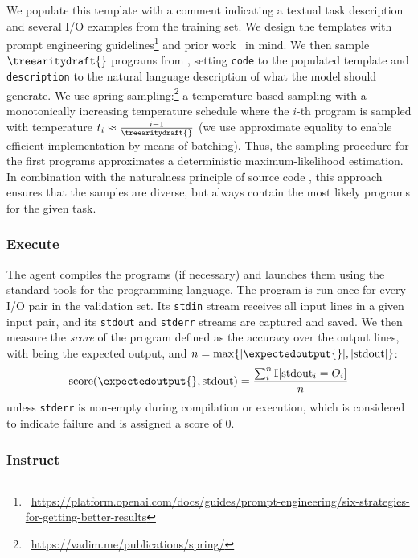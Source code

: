 We populate this template with a comment indicating a textual task description and several I/O examples from the training set.
We design the templates with prompt engineering guidelines\footnote{~\url{https://platform.openai.com/docs/guides/prompt-engineering/six-strategies-for-getting-better-results}} and prior work~\cite{debruin2021:autoencoders} in mind.
We then sample $\treearitydraft{}$ programs from \synthmodelnoargs{}, setting \texttt{code} to the populated template and \texttt{description} to the natural language description of what the model should generate.
We use spring sampling:\footnote{~\url{https://vadim.me/publications/spring/}} a temperature-based sampling with a monotonically increasing temperature schedule where the $i$-th program is sampled with temperature $t_i \approx \frac{i-1}{\treearitydraft{}}$ (we use approximate equality to enable efficient implementation by means of batching).
Thus, the sampling procedure for the first programs approximates a deterministic maximum-likelihood estimation.
In combination with the naturalness principle of source code \cite{allamanis2018:survey,jiang2022:bugs}, this approach ensures that the samples are diverse, but always contain the most likely programs for the given task.

\subsubsection{Execute}
\label{sec:execute}

The \execute{} agent compiles the programs (if necessary) and launches them using the standard tools for the programming language.
The program is run once for every I/O pair in the validation set. 
Its \texttt{stdin} stream receives all input lines in a given input pair, and its \texttt{stdout} and \texttt{stderr} streams are captured and saved.
We then measure the \emph{score} of the program defined as the accuracy over the output lines, with \expectedoutput{} being the expected output, and $n=\max\{|\expectedoutput{}|, |\text{stdout}|\}$:
\[    
\text{score}(\expectedoutput{}, \text{stdout}) = \frac{\sum^{n}_i{\mathbb{I}[\text{stdout}_i = O_i]}}{n} 
\]
unless \texttt{stderr} is non-empty during compilation or execution, which is considered to indicate failure and is assigned a score of 0.

\subsubsection{Instruct}
\label{sec:instruct}

